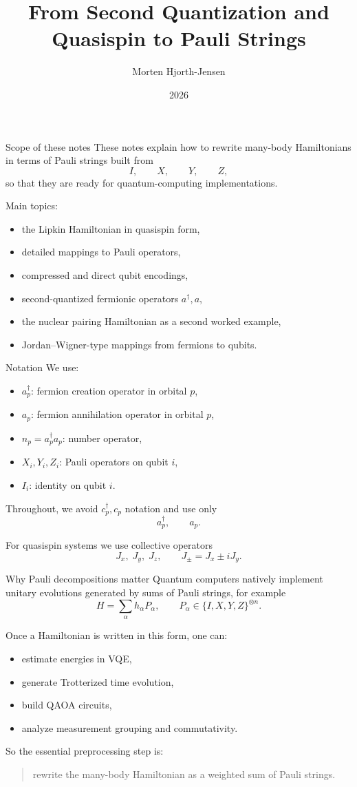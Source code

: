 \documentclass[aspectratio=169]{beamer}
\title{From Second Quantization and Quasispin to Pauli Strings}
\author{Morten Hjorth-Jensen}
\date{2026}
\begin{document}
\frame{\titlepage}

\begin{frame}{Scope of these notes}
These notes explain how to rewrite many-body Hamiltonians in terms of Pauli strings
built from
\[
I,\qquad X,\qquad Y,\qquad Z,
\]
so that they are ready for quantum-computing implementations.

\medskip

Main topics:
\begin{itemize}
\item the Lipkin Hamiltonian in quasispin form,
\item detailed mappings to Pauli operators,
\item compressed and direct qubit encodings,
\item second-quantized fermionic operators \(a^\dagger,a\),
\item the nuclear pairing Hamiltonian as a second worked example,
\item Jordan--Wigner-type mappings from fermions to qubits.
\end{itemize}
\end{frame}

\begin{frame}{Notation}
We use:
\begin{itemize}
\item \(a_p^\dagger\): fermion creation operator in orbital \(p\),
\item \(a_p\): fermion annihilation operator in orbital \(p\),
\item \(n_p=a_p^\dagger a_p\): number operator,
\item \(X_i,Y_i,Z_i\): Pauli operators on qubit \(i\),
\item \(I_i\): identity on qubit \(i\).
\end{itemize}

Throughout, we avoid \(c_p^\dagger,c_p\) notation and use only
\[
a_p^\dagger,\qquad a_p.
\]

For quasispin systems we use collective operators
\[
J_x,\; J_y,\; J_z,\qquad J_\pm = J_x \pm i J_y.
\]
\end{frame}

\begin{frame}{Why Pauli decompositions matter}
Quantum computers natively implement unitary evolutions generated by sums of Pauli strings,
for example
\[
H = \sum_\alpha h_\alpha P_\alpha,
\qquad
P_\alpha \in \{I,X,Y,Z\}^{\otimes n}.
\]

Once a Hamiltonian is written in this form, one can:
\begin{itemize}
\item estimate energies in VQE,
\item generate Trotterized time evolution,
\item build QAOA circuits,
\item analyze measurement grouping and commutativity.
\end{itemize}

So the essential preprocessing step is:
\begin{quote}
rewrite the many-body Hamiltonian as a weighted sum of Pauli strings.
\end{quote}
\end{frame}
\end{document}
